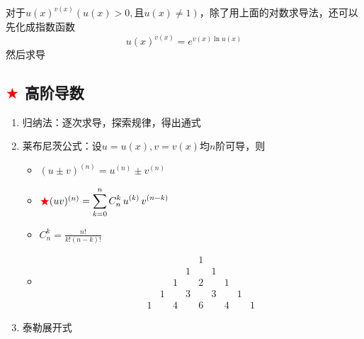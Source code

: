 \documentclass[a4paper,12pt]{article}
\begin{document}
    对于$u(x)^{v(x)}(u(x) > 0, \text{且}u(x) \neq 1)$，除了用上面的对数求导法，还可以先化成指数函数
    \[
        u(x)^{v(x)} = e^{v(x)\ln u(x)}
    \]
    然后求导

    \subsection{\textcolor{red}{$\bigstar$} 高阶导数}
    \begin{enumerate}
        \item 归纳法：逐次求导，探索规律，得出通式
        \item 莱布尼茨公式：设$u = u(x), v = v(x)$均$n$阶可导，则
        \begin{itemize}
            \item $(u \pm v)^{(n)} = u^{(n)} \pm v^{(n)}$
            \item ${\color{red}{\bigstar}}(uv)^{(n)} = \displaystyle\sum_{k=0}^{n}C_n^k\,u^{(k)}\,v^{(n-k)}$
            \item $C_n^k = \displaystyle\frac{n!}{k!(n-k)!}$
            \item \[
                      \begin{array}{ccccccccc}
                          & & & & 1 \\
                          & & & 1 & & 1 \\
                          & & 1 & & 2 & & 1 \\
                          & 1 & & 3 & & 3 & & 1 \\
                          1 & & 4 & & 6 & & 4 & & 1
                      \end{array}
            \]
        \end{itemize}
        \item 泰勒展开式
\end{enumerate}
\end{document}
